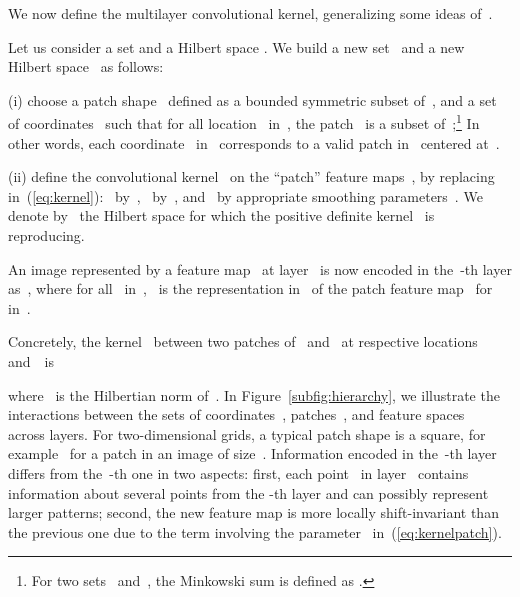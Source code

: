 We now define the multilayer convolutional kernel,
generalizing some ideas of~\cite{bo2011}.

\begin{definition}\label{def:multiscattering}
   Let us consider a set  and a Hilbert space .
   We build a new set~ and a new Hilbert space~ as follows:

   (i) choose a patch shape~ defined as a bounded symmetric subset
   of~, and a set of coordinates~
   such that for all location~ in~, the patch~ is a subset of~;\footnote{For two sets~
   and~, the Minkowski sum  is defined as .\label{foot:minkowski}}
   In other words, each coordinate~ in~ corresponds to a valid patch in~ centered at~.

   (ii) define the convolutional kernel~ on the ``patch'' feature maps~, by replacing in~(\ref{eq:kernel}):~ by~,~
   by~, and~ by appropriate smoothing
   parameters~. We denote by~ the Hilbert space for
   which the positive definite kernel~ is reproducing.

   An image represented by a feature map~ at layer~ is now encoded in the~-th layer as~, where for all~ in~,~ is the representation
   in~ of the patch feature map~ for~ in~.
\end{definition}
Concretely, the kernel~ between two patches of~ and~ at respective locations~ and~~is
\vspace*{-0.1cm}

where~ is the Hilbertian norm of~.
In Figure~\ref{subfig:hierarchy}, we illustrate the interactions
between the sets of coordinates~, patches~, and feature spaces~ across
layers. For two-dimensional grids, a typical patch
shape is a square, for example~ for a  patch in an image of size~. Information encoded in the~-th layer differs from the~-th one in two aspects:
first, each point~ in layer~ contains
information about several points from the -th layer and can possibly represent
larger patterns; second, the new feature map is more locally shift-invariant than the previous one due to the
term involving the parameter~ in~(\ref{eq:kernelpatch}). 

